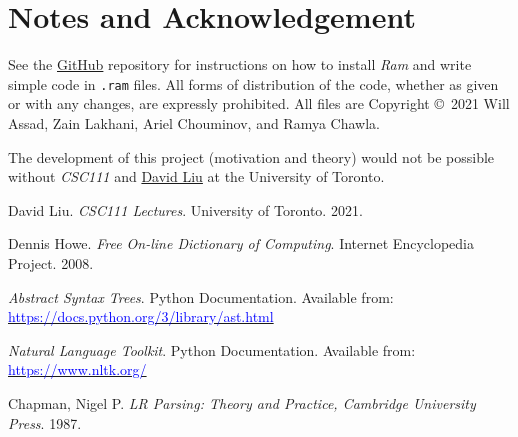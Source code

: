 \documentclass[11pt]{article}
\newcommand{\blue}[1]{\textcolor{blue}{#1}}
\newcommand{\link}[1]{\href{#1}{\blue{#1}}}
\begin{document}
\section{Notes and Acknowledgement}

See the \href{https://github.com/willassad/ram}{GitHub} repository for instructions on how to install \emph{Ram} and write simple code in \texttt{.ram} files. All forms of distribution of the code, whether as given or with any changes,
are expressly prohibited. All files are Copyright \copyright \, 2021 Will Assad, Zain Lakhani, Ariel Chouminov, and Ramya Chawla.

\bigskip

\noindent The development of this project (motivation and theory) would not be possible without \emph{CSC111} and \href{https://www.cs.toronto.edu/~david/}{David Liu} at the University of Toronto.

\newpage

\begin{thebibliography}{9}

David Liu. \textit{CSC111 Lectures}. University of Toronto. 2021.

Dennis Howe. \textit{Free On-line Dictionary of Computing}. Internet Encyclopedia Project. 2008.

\textit{Abstract Syntax Trees}. Python Documentation. Available from: \link{https://docs.python.org/3/library/ast.html}

\textit{Natural Language Toolkit}. Python Documentation. Available from: \link{https://www.nltk.org/}

Chapman, Nigel P. \textit{LR Parsing: Theory and Practice, Cambridge University Press}. 1987.

\end{thebibliography}
\end{document}
